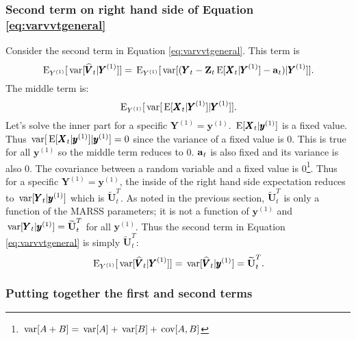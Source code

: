 \documentclass[]{article}
\def\XI{\mbox{\boldmath $\Xi$}}
\def\E{\,\textup{\textrm{E}}}
\def\UU{\mbox{$\mathbf U$}}	\def\uu{\mbox{$\mathbf u$}}
\def\VV{\mbox{$\pmb{V}$}}	\def\vv{\mbox{$\pmb{v}$}}
\def\XX{\mbox{$\pmb{X}$}}	\def\xx{\mbox{$\pmb{x}$}}
\def\YY{\mbox{$\pmb{Y}$}}	\def\yy{\mbox{$\pmb{y}$}}
\def\ZZ{\mbox{$\mathbf Z$}}	\def\zz{\mbox{$\mathbf z$}}	\def\Zb{\mbox{$\mathbf M$}} \def\Za{\mbox{$\mathbf N$}} \def\Zm{\XI}
\def\var{\,\textup{\textrm{var}}}
\def\cov{\,\textup{\textrm{cov}}}
\def\hatVt{\widehat{\VV}_t}
\def\hatUtT{\widetilde{\UU}_t^T}
\begin{document}
\subsubsection{Second term on right hand side of Equation \ref{eq:varvvtgeneral}}

Consider the second term in Equation \ref{eq:varvvtgeneral}.  This term is 
\begin{equation}\label{eq:second.term.rhs.9}
\E_{Y^{(1)}}[\var[\hatVt|\YY^{(1)}]] = \E_{Y^{(1)}}[\var[(\YY_t-\ZZ_t\E[\XX_t|\YY^{(1)}]-\aa_t)|\YY^{(1)}]] .
\end{equation}
The middle term is:
\begin{equation}
\E_{Y^{(1)}}[\var[\E[\XX_t|\YY^{(1)}]|\YY^{(1)}]].
\end{equation}
Let's solve the inner part for a specific $\YY^{(1)}=\yy^{(1)}$. $\E[\XX_t|\yy^{(1)}]$ is a fixed value. Thus  $\var[\E[\XX_t|\yy^{(1)}]|\yy^{(1)}]=0$ since the variance of a fixed value is 0. This is true for all $\yy^{(1)}$ so the middle term reduces to 0. $\aa_t$ is also fixed and its variance is also 0. The covariance between a random variable and a fixed value is 0\footnote{$\var[A+B] = \var[A]+\var[B]+\cov[A,B]$}. Thus for a specific $\YY^{(1)}=\yy^{(1)}$, the inside of the right hand side expectation reduces to $\var[\YY_t|\yy^{(1)}]$ which is $\hatUtT$. As noted in the previous section, $\hatUtT$ is only a function of the MARSS parameters; it is not a function of $\yy^{(1)}$ and $\var[\YY_t|\yy^{(1)}]=\hatUtT$ for all $\yy^{(1)}$. Thus the second term in Equation \ref{eq:varvvtgeneral} is simply $\hatUtT$:
\begin{equation}\label{eq:second.term.rhs.9final}
\E_{Y^{(1)}}[\var[\hatVt|\YY^{(1)}]] = \var[\hatVt|\yy^{(1)}] = \hatUtT .
\end{equation}

\subsubsection{Putting together the first and second terms}
\end{document}

